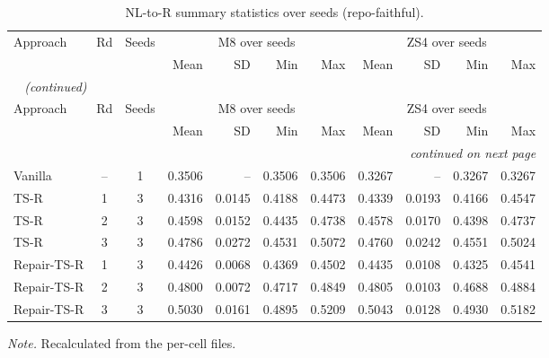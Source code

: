 {\small
{}
\setlength{\tabcolsep}{4.2pt}
\begin{longtable}{@{}lccrrrrrrrr@{}}
\caption{NL-to-R summary statistics over seeds (repo-faithful).}\label{tab:gen-nlr-stats}\\
\toprule
\rowcolor{headshade}Approach & Rd & Seeds & \multicolumn{4}{c}{M8 over seeds} & \multicolumn{4}{c}{ZS4 over seeds}\\\rowcolor{headshade} & & & Mean & SD & Min & Max & Mean & SD & Min & Max\\
\midrule
\endfirsthead
\multicolumn{11}{l}{\textit{\tablename~\thetable{} (continued)}}\\
\toprule
\rowcolor{headshade}Approach & Rd & Seeds & \multicolumn{4}{c}{M8 over seeds} & \multicolumn{4}{c}{ZS4 over seeds}\\\rowcolor{headshade} & & & Mean & SD & Min & Max & Mean & SD & Min & Max\\
\midrule
\endhead
\midrule
\multicolumn{11}{r}{\textit{continued on next page}}\\
\endfoot
\bottomrule
\endlastfoot
Vanilla & -- & 1 & 0.3506 & -- & 0.3506 & 0.3506 & 0.3267 & -- & 0.3267 & 0.3267\\
TS-R & 1 & 3 & 0.4316 & 0.0145 & 0.4188 & 0.4473 & 0.4339 & 0.0193 & 0.4166 & 0.4547\\
TS-R & 2 & 3 & 0.4598 & 0.0152 & 0.4435 & 0.4738 & 0.4578 & 0.0170 & 0.4398 & 0.4737\\
TS-R & 3 & 3 & 0.4786 & 0.0272 & 0.4531 & 0.5072 & 0.4760 & 0.0242 & 0.4551 & 0.5024\\
Repair-TS-R & 1 & 3 & 0.4426 & 0.0068 & 0.4369 & 0.4502 & 0.4435 & 0.0108 & 0.4325 & 0.4541\\
Repair-TS-R & 2 & 3 & 0.4800 & 0.0072 & 0.4717 & 0.4849 & 0.4805 & 0.0103 & 0.4688 & 0.4884\\
Repair-TS-R & 3 & 3 & 0.5030 & 0.0161 & 0.4895 & 0.5209 & 0.5043 & 0.0128 & 0.4930 & 0.5182\\
\end{longtable}
}
\vspace{-0.6\baselineskip}
{\footnotesize\color{slate}\textit{Note.} Recalculated from the per-cell files.\par}
\medskip
